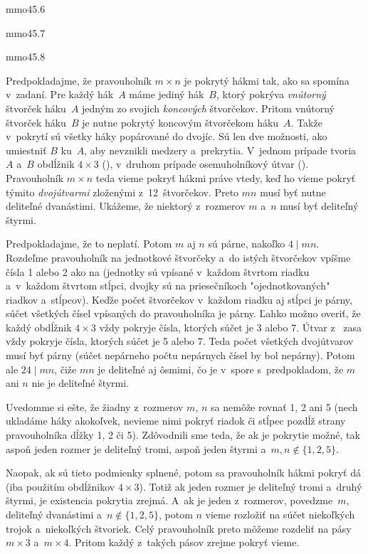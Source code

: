 {%
\epsplace mmo45.6 \hfil\Obr

\epsplace mmo45.7 \hfil\Obr

\epsplace mmo45.8 \hfil\Obr

Predpokladajme, že pravouholník $m\times n$ je pokrytý hákmi tak, ako sa spomína v~zadaní. Pre každý hák~$A$ máme
jediný hák~$B$, ktorý pokrýva {\it vnútorný\/} štvorček háku~$A$ jedným zo svojich {\it koncových\/} štvorčekov. Pritom
vnútorný štvorček háku~$B$ je nutne pokrytý koncovým štvorčekom háku~$A$. Takže v~pokrytí sú všetky háky popárované do
\vadjust{\bigskip\centerline{\inspicture-!\hss\inspicture-!}\bigskip}
dvojíc. Sú len dve možnosti, ako umiestniť $B$ ku~$A$, aby nevznikli medzery a~prekrytia. V~jednom prípade tvoria
$A$ a~$B$ obdĺžnik $4\times3$ (\obr), v~druhom prípade osemuholníkový útvar (\obr).
Pravouholník $m\times n$ teda vieme pokryť hákmi práve vtedy, keď ho vieme pokryť týmito {\it dvojútvarmi\/} zloženými
z~12~štvorčekov. Preto $mn$ musí byť nutne deliteľné dvanástimi. Ukážeme, že niektorý z~rozmerov $m$ a~$n$ musí byť deliteľný štyrmi.

Predpokladajme, že to neplatí. Potom $m$ aj $n$ sú párne, nakoľko $4\mid mn$. Rozdeľme pravouholník na jednotkové
štvorčeky a~do istých štvorčekov vpíšme čísla 1 alebo 2 ako na \obr{} (jednotky sú vpísané v~každom štvrtom riadku a~v~každom štvrtom stĺpci, dvojky sú na priesečníkoch "ojednotkovaných" riadkov a~stĺpcov).
\inspicture 
Keďže počet štvorčekov v~každom riadku aj stĺpci je párny, súčet všetkých čísel vpísaných do pravouholníka je párny.
Ľahko možno overiť, že každý obdĺžnik $4\times3$ vždy pokryje čísla, ktorých súčet je 3 alebo 7. Útvar z~
zasa vždy pokryje čísla, ktorých súčet je 5 alebo 7. Teda počet všetkých dvojútvarov musí byť párny
(súčet nepárneho počtu nepárnych čísel by bol nepárny). Potom ale $24\mid mn$, čiže $mn$ je deliteľné aj ôsmimi, čo je v~spore s~predpokladom, že $m$ ani $n$ nie je deliteľné štyrmi.

Uvedomme si ešte, že žiadny z~rozmerov $m$, $n$ sa nemôže rovnať 1, 2 ani 5 (nech ukladáme háky akokoľvek, nevieme nimi pokryť riadok či stĺpec pozdĺž strany pravouholníka dĺžky 1, 2 či 5). Zdôvodnili sme teda, že ak je pokrytie možné, tak aspoň jeden rozmer je deliteľný tromi, aspoň jeden štyrmi a~$m,n\notin\{1,2,5\}$.

Naopak, ak sú tieto podmienky splnené, potom sa pravouholník hákmi pokryť dá (iba použitím obdĺžnikov $4\times3$). Totiž ak jeden rozmer je deliteľný tromi a~druhý štyrmi, je existencia pokrytia zrejmá. A~ak je jeden z~rozmerov, povedzme~$m$, deliteľný dvanástimi a~$n\notin\{1,2,5\}$, potom $n$ vieme rozložiť na súčet niekoľkých trojok a~niekoľkých štvoriek. Celý pravouholník preto môžeme rozdeliť na pásy $m\times3$ a~$m\times4$. Pritom každý z~takých pásov zrejme pokryť vieme.}


